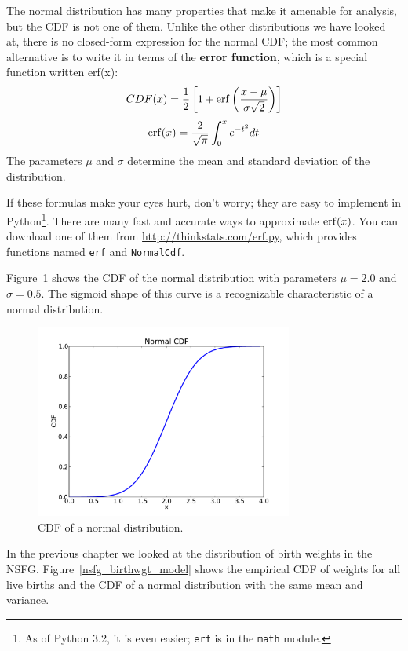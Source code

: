 \documentclass[12pt]{book}
\begin{document}
The normal distribution has many properties that make it amenable for
analysis, but the CDF is not one of them.  Unlike the
other distributions we have looked at, there is no closed-form
expression for the normal CDF; the most common alternative is to write
it in terms of the {\bf error function}, which is a special function
written erf(x):
%
\[ CDF(x) = \frac{1}{2} \left[ 1 +
  \mathrm{erf} \left( \frac{x - \mu}{\sigma \sqrt{2}} \right) \right] \]
%
\[ \mathrm{erf}(x) = \frac{2}{\sqrt{\pi}} \int_{0}^x e^{-t^2} dt \]
%
The parameters $\mu$ and $\sigma$ determine the mean and standard
deviation of the distribution.

If these formulas make your eyes hurt, don't worry; they are easy to
implement in Python\footnote{As of Python 3.2, it is even easier; 
{\tt erf} is in the {\tt math} module.}.  There are many fast and
accurate ways to approximate $\mathrm{erf}(x)$.  You can download one of them
from \url{http://thinkstats.com/erf.py}, which provides functions named
{\tt erf} and {\tt NormalCdf}.

Figure~\ref{normal_cdf} shows the CDF of the normal distribution
with parameters $\mu = 2.0$ and $\sigma = 0.5$.  The sigmoid shape of
this curve is a recognizable characteristic of a normal distribution.

\begin{figure}
\centerline{\includegraphics[height=2.5in]{figs/normal_cdf.pdf}}
\caption{CDF of a normal distribution.}
\label{normal_cdf}
\end{figure}

In the previous chapter we looked at the distribution of birth
weights in the NSFG.  Figure~\ref{nsfg_birthwgt_model} shows the
empirical CDF of weights for all live births and the CDF of
a normal distribution with the same mean and variance.
\end{document}
